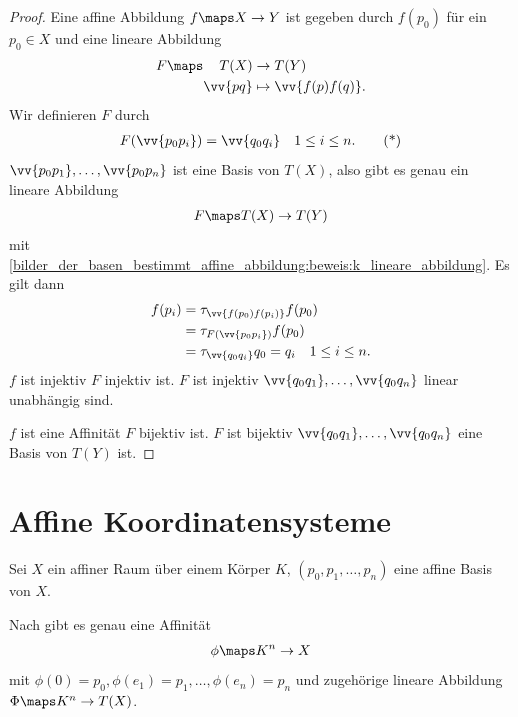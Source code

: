 \begin{proof}
    Eine affine Abbildung \( f\maps X\to Y \) ist gegeben durch \( f(p_0) \) für ein \( p_0\in X \) und eine lineare Abbildung
    \begin{align*}
        F\maps \begin{aligned}[t]
            T(X)&\to T(Y)\\
            \vv{pq}&\mapsto \vv{f(p)f(q)}.
        \end{aligned}
    \end{align*}
    Wir definieren \( F \) durch
    \begin{align*}
        F(\vv{p_0 p_i})=\vv{q_0 q_i}\quad 1\leq i \leq n. \tag{*}\label{bilder_der_basen_bestimmt_affine_abbildung:beweis:k_lineare_abbildung}
    \end{align*}
    \( \vv{p_0 p_1}, \dotsc, \vv{p_0 p_n} \) ist eine Basis von \( T(X) \), also gibt es genau ein lineare Abbildung
    \begin{align*}
        F\maps T(X)\to T(Y)
    \end{align*}
    mit \eqref{bilder_der_basen_bestimmt_affine_abbildung:beweis:k_lineare_abbildung}. Es gilt dann
    \begin{align*}
        f(p_i)\begin{aligned}[t]
            &=\tau_{\vv{f(p_0) f(p_i)}} f(p_0)\\
            &=\tau_{F(\vv{p_0 p_i})} f(p_0)\\
            &=\tau_{\vv{q_0 q_i}} q_0 =q_i \quad 1\leq i \leq n.
        \end{aligned}
    \end{align*}
    \( f \) ist injektiv \gdw \( F \) injektiv ist. \( F \) ist injektiv \gdw \( \vv{q_0 q_1}, \dotsc, \vv{q_0 q_n} \) linear unabhängig sind.

    \tto \( f \) ist eine Affinität \gdw \( F \) bijektiv ist. \( F \) ist bijektiv \gdw \( \vv{q_0 q_1}, \dotsc, \vv{q_0 q_n} \) eine Basis von \( T(Y) \) ist.

\end{proof}
\section*{Affine Koordinatensysteme}
Sei \( X \) ein affiner Raum über einem Körper \( K \), \( (p_0,p_1,\dotsc, p_n) \) eine affine Basis von \( X \).

Nach  gibt es genau eine Affinität
\begin{align*}
    \phi\maps K^n\to X
\end{align*}
mit \( \phi(0)=p_0, \phi(e_1)=p_1,\dotsc, \phi(e_n)=p_n \) und zugehörige lineare Abbildung \( \Phi\maps K^n \to T(X) \).


